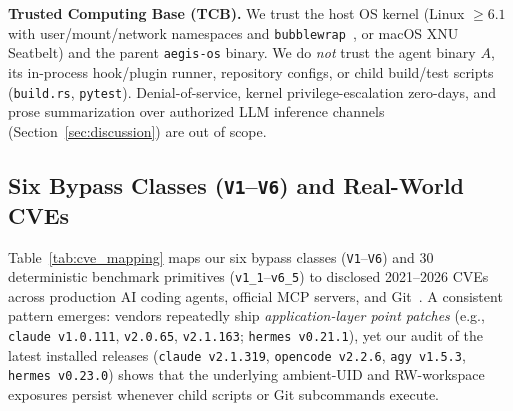 \documentclass[10pt,journal,compsoc]{IEEEtran}
\begin{document}
\noindent\textbf{Trusted Computing Base (TCB).} We trust the host OS kernel (Linux $\ge 6.1$ with user/mount/network namespaces and \texttt{bubblewrap}~\cite{containers2024bubblewrap}, or macOS XNU Seatbelt) and the parent \texttt{aegis-os} binary. We do \emph{not} trust the agent binary $A$, its in-process hook/plugin runner, repository configs, or child build/test scripts (\texttt{build.rs}, \texttt{pytest}). Denial-of-service, kernel privilege-escalation zero-days, and prose summarization over authorized LLM inference channels (Section~\ref{sec:discussion}) are out of scope.

\subsection{Six Bypass Classes (\texttt{V1}--\texttt{V6}) and Real-World CVEs}

Table~\ref{tab:cve_mapping} maps our six bypass classes (\texttt{V1}--\texttt{V6}) and 30 deterministic benchmark primitives (\texttt{v1\_1}--\texttt{v6\_5}) to disclosed 2021--2026 CVEs across production AI coding agents, official MCP servers, and Git~\cite{checkpoint2026hook,nvd2026agentfs,nvd2025mcpremote,nvd2026fsmonitor,boucher2023trojan}. A consistent pattern emerges: vendors repeatedly ship \emph{application-layer point patches} (e.g., \texttt{claude v1.0.111}, \texttt{v2.0.65}, \texttt{v2.1.163}; \texttt{hermes v0.21.1}), yet our audit of the latest installed releases (\texttt{claude v2.1.319}, \texttt{opencode v2.2.6}, \texttt{agy v1.5.3}, \texttt{hermes v0.23.0}) shows that the underlying ambient-UID and RW-workspace exposures persist whenever child scripts or Git subcommands execute.
\end{document}
